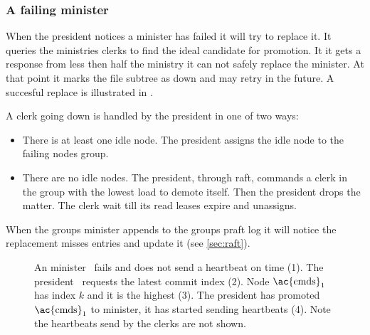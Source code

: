 \subsubsection*{A failing minister}
When the president notices a minister has failed it will try to replace it. It queries the ministries clerks to find the ideal candidate for promotion. It it gets a response from less then half the ministry it can not safely replace the minister. At that point it marks the file subtree as down and may retry in the future. A succesful replace is illustrated in .

A clerk going down is handled by the president in one of two ways:
\begin{itemize}
	\item There is at least one idle node. The president assigns the idle node to the failing nodes group. 
	\item There are no idle nodes. The president, through raft, commands a clerk in the group with the lowest load to demote itself. Then the president drops the matter. The clerk wait till its read leases expire and unassigns.
\end{itemize}
%
When the groups minister appends to the groups \ac{praft} log it will notice the replacement misses entries and update it (see \cref{sec:raft}).

\begin{figure}[htbp]
	\centering
	
	\caption{An minister~\amdsLeg{} fails and does not send a heartbeat on time (1). The president~\presidentLeg{} requests the latest commit index (2). Node $\text{\ac{cmds}}_1$~\cmdsLeg{} has index $k$ and it is the highest (3). The president has promoted $\text{\ac{cmds}}_1$ to minister, it has started sending heartbeats (4). Note the heartbeats send by the clerks are not shown.}
	\label{fig:appoint}
\end{figure}
%

